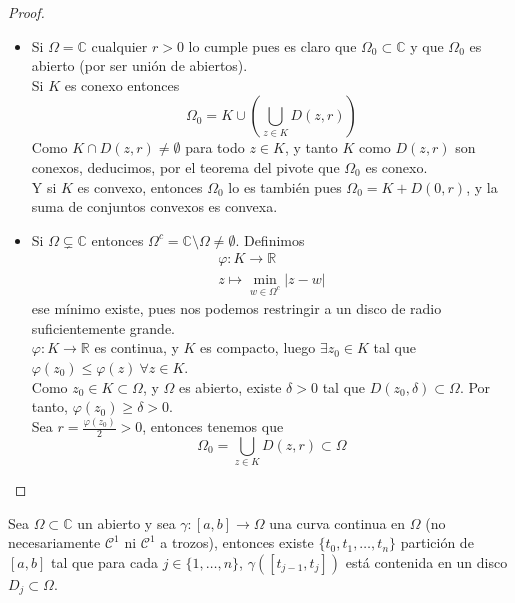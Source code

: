\begin{proof}
    \leavevmode
    \begin{itemize}
        \item Si $\Omega = \mathbb{C}$ cualquier $r > 0$ lo cumple pues es claro que $\Omega_0 \subset \mathbb{C}$ y que $\Omega_0$ es abierto (por ser unión de abiertos).\\
        Si $K$ es conexo entonces
        \[
            \Omega_0 = K \cup \left(\bigcup_{z \in K} D(z, r)\right) 
        \]
        Como $K \cap D(z, r) \neq \emptyset$ para todo $z \in K$, y tanto $K$ como $D(z, r)$ son conexos, deducimos, por el teorema del pivote que $\Omega_0$ es conexo.\\
        Y si $K$ es convexo, entonces $\Omega_0$ lo es también pues $\Omega_0 = K + D(0, r)$, y la suma de conjuntos convexos es convexa.\\
        \item Si $\Omega \subsetneq \mathbb{C}$ entonces $\Omega^c = \mathbb{C} \setminus \Omega \neq \emptyset$. Definimos
        \[
            \begin{matrix}
                \varphi : K \to \mathbb{R} \\
                z \mapsto \min_{w \in \Omega^c} |z - w|
            \end{matrix}
        \]
        ese mínimo existe, pues nos podemos restringir a un disco de radio suficientemente grande.\\
        $\varphi : K \to \mathbb{R}$ es continua, y $K$ es compacto, luego $\exists z_0 \in K$ tal que $\varphi(z_0) \leq \varphi(z) \ \forall z \in K$.\\
        Como $z_0 \in K \subset \Omega$, y $\Omega$ es abierto, existe $\delta > 0$ tal que $D(z_0, \delta) \subset \Omega$. Por tanto, $\varphi(z_0) \geq \delta > 0$.\\
        Sea $r = \frac{\varphi(z_0)}{2} > 0$, entonces tenemos que 
        \[
            \Omega_0 = \bigcup_{z \in K} D(z, r) \subset \Omega
        \]
    \end{itemize}    
\end{proof}

\begin{lema}
    Sea $\Omega \subset \mathbb{C}$ un abierto y sea $\gamma : [a, b] \to \Omega$ una curva continua en $\Omega$ (no necesariamente $\mathcal{C}^1$ ni $\mathcal{C}^1$ a trozos), entonces existe $\{t_0, t_1, \ldots, t_n\}$ partición de $[a, b]$ tal que para cada $j \in \{1, \ldots, n\}$, $\gamma([t_{j-1}, t_j])$ está contenida en un disco $D_j \subset \Omega$.
\end{lema}

